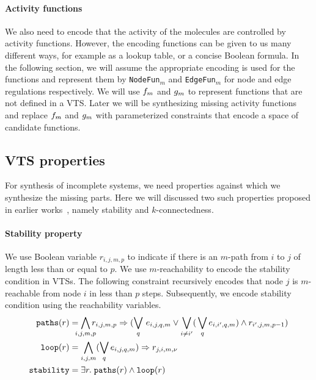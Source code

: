 \paragraph{Activity functions}
We also need to encode that
the activity of the molecules are controlled by activity functions.
%
However, the encoding functions can be given to us many different ways,
for example as a lookup table, or a concise Boolean formula.
%
In the following section, we will assume the appropriate encoding is
used for the functions and represent them by \texttt{NodeFun}$_m$
and \texttt{EdgeFun}$_m$ for node and edge regulations respectively.
%
We will use $f_m$ and $g_m$ to represent functions that
are not defined in a VTS.
%
%
Later we will be synthesizing missing activity functions and 
replace $f_m$ and $g_m$ with parameterized constraints that
encode a space of candidate functions.

\subsection{VTS properties}

For synthesis of incomplete systems,
we need properties  against which we synthesize the missing parts.
%
Here we will discussed two such properties proposed in earlier
works~\cite{SASBpaper}, namely stability and $k$-connectedness.
%

\paragraph{Stability property}
%
We use Boolean variable $r_{i,j,m,p}$ to indicate if there is an
$m$-path from $i$ to $j$ of length less than or equal to $p$.
%
We use $m$-reachability to encode the stability condition in VTSs.
%
The following constraint recursively encodes that node $j$ is
$m$-reachable from node $i$ in less than $p$ steps.
%
Subsequently, we encode stability condition using the reachability variables.
\begin{align*}
  \texttt{paths}(r) &= \bigwedge\limits_{\mathclap{i,j,m,p}} r_{i,j,m,p} \limplies (\bigvee_{q} \, e_{i,j,q,m} \lor \bigvee_{i\neq i^{\prime}} ( \, \bigvee_{q} e_{i,i^{\prime},q,m}) \land r_{i^{\prime},j,m,p-1} )
  \\
  \texttt{loop}(r) &= \bigwedge\limits_{i,j,m} (\bigvee_{q} e_{i,j,q,m}) \limplies r_{j,i,m,\nu}
  \\
  \texttt{stability} &= \exists r. \; \texttt{paths}(r) \land \texttt{loop}(r)
\end{align*}


